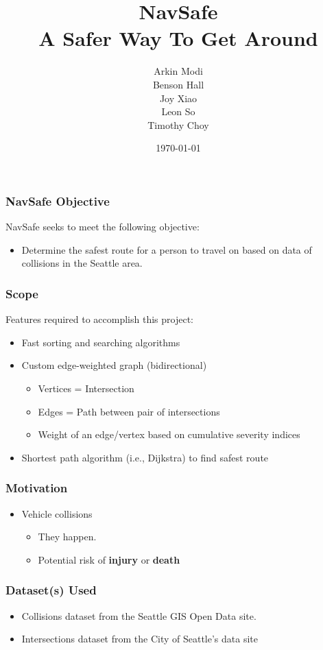 \documentclass[t,12pt,numbers,fleqn]{beamer}
\title{
    NavSafe\\
    \large A Safer Way To Get Around
}
\author{
    Arkin Modi\\
    Benson Hall\\
    Joy Xiao\\
    Leon So\\
    Timothy Choy
}
\institute{Department of Software and Computing, McMaster University}
\date{\today}
\begin{document}
 
\frame{\titlepage}


\begin{frame}
\frametitle{NavSafe Objective}
NavSafe seeks to meet the following objective:
\begin{itemize}
    \item Determine the safest route for a person to travel on based on data of collisions in the Seattle area.
\end{itemize}
\end{frame}
 
\begin{frame}
\frametitle{Scope}
Features required to accomplish this project:
\begin{itemize}
    \item Fast sorting and searching algorithms
    \item Custom edge-weighted graph (bidirectional)
    \begin{itemize}
        \item[] Vertices = Intersection
        \item[] Edges = Path between pair of intersections
        \item[] Weight of an edge/vertex based on cumulative severity indices 
    \end{itemize}
    \item Shortest path algorithm (i.e., Dijkstra) to find safest route
\end{itemize}

\end{frame}
\begin{frame}
\frametitle{Motivation}
\begin{itemize}
    \item Vehicle collisions
    \begin{itemize}
        \item They happen.
        \item Potential risk of \textbf{injury} or \textbf{death}
    \end{itemize}
\end{itemize}
\end{frame}
\begin{frame}
\frametitle{Dataset(s) Used}
\begin{itemize}
    \item Collisions dataset from the Seattle GIS Open Data site.
    \item Intersections dataset from the City of Seattle's data site
\end{itemize}
\end{frame}
\end{document}
